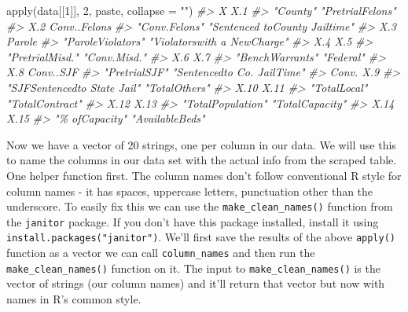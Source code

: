 \documentclass[
  12pt,
]{book}
\newenvironment{Shaded}{\begin{snugshade}}{\end{snugshade}}
\newcommand{\AttributeTok}[1]{\textcolor[rgb]{0.61,0.61,0.61}{#1}}
\newcommand{\CommentTok}[1]{\textcolor[rgb]{0.37,0.37,0.37}{\textit{#1}}}
\newcommand{\DecValTok}[1]{\textcolor[rgb]{0.06,0.06,0.06}{#1}}
\newcommand{\FunctionTok}[1]{\textcolor[rgb]{0,0,0}{#1}}
\newcommand{\NormalTok}[1]{#1}
\newcommand{\StringTok}[1]{\textcolor[rgb]{0.5,0.5,0.5}{#1}}
\begin{document}
\begin{Shaded}
\begin{Highlighting}[]
\FunctionTok{apply}\NormalTok{(data[[}\DecValTok{1}\NormalTok{]], }\DecValTok{2}\NormalTok{, paste, }\AttributeTok{collapse =} \StringTok{""}\NormalTok{)}
\CommentTok{\#\textgreater{}                             X                           X.1 }
\CommentTok{\#\textgreater{}                      "County"              "PretrialFelons" }
\CommentTok{\#\textgreater{}                           X.2                  Conv..Felons }
\CommentTok{\#\textgreater{}                 "Conv.Felons" "Sentenced toCounty Jailtime" }
\CommentTok{\#\textgreater{}                           X.3                        Parole }
\CommentTok{\#\textgreater{}             "ParoleViolators"   "Violatorswith a NewCharge" }
\CommentTok{\#\textgreater{}                           X.4                           X.5 }
\CommentTok{\#\textgreater{}               "PretrialMisd."                  "Conv.Misd." }
\CommentTok{\#\textgreater{}                           X.6                           X.7 }
\CommentTok{\#\textgreater{}               "BenchWarrants"                     "Federal" }
\CommentTok{\#\textgreater{}                           X.8                     Conv..SJF }
\CommentTok{\#\textgreater{}                 "PretrialSJF"    "Sentencedto Co. JailTime" }
\CommentTok{\#\textgreater{}                         Conv.                           X.9 }
\CommentTok{\#\textgreater{}   "SJFSentencedto State Jail"                 "TotalOthers" }
\CommentTok{\#\textgreater{}                          X.10                          X.11 }
\CommentTok{\#\textgreater{}                  "TotalLocal"               "TotalContract" }
\CommentTok{\#\textgreater{}                          X.12                          X.13 }
\CommentTok{\#\textgreater{}             "TotalPopulation"               "TotalCapacity" }
\CommentTok{\#\textgreater{}                          X.14                          X.15 }
\CommentTok{\#\textgreater{}                "\% ofCapacity"               "AvailableBeds"}
\end{Highlighting}
\end{Shaded}

Now we have a vector of 20 strings, one per column in our data. We will use this to name the columns in our data set with the actual info from the scraped table. One helper function first. The column names don't follow conventional R style for column names - it has spaces, uppercase letters, punctuation other than the underscore. To easily fix this we can use the \texttt{make\_clean\_names()} function from the \texttt{janitor} package. If you don't have this package installed, install it using \texttt{install.packages("janitor")}. We'll first save the results of the above \texttt{apply()} function as a vector we can call \texttt{column\_names} and then run the \texttt{make\_clean\_names()} function on it. The input to \texttt{make\_clean\_names()} is the vector of strings (our column names) and it'll return that vector but now with names in R's common style.
\end{document}
